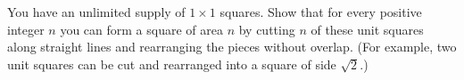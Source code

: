 You have an unlimited supply of $1\times1$ squares. Show that for every positive integer $n$ you can form a square of area $n$ by cutting $n$ of these unit squares along straight lines and rearranging the pieces without overlap. (For example, two unit squares can be cut and rearranged into a square of side $\sqrt2$.)
